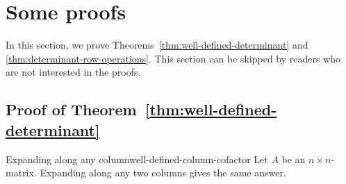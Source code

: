 \section{Some proofs}

In this section, we prove Theorems~\ref{thm:well-defined-determinant}
and {\ref{thm:determinant-row-operations}}. This section can be
skipped by readers who are not interested in the proofs.

\subsection{Proof of Theorem~\ref{thm:well-defined-determinant}}

\begin{lemma}{Expanding along any column}{well-defined-column-cofactor}
  Let $A$ be an $n\times n$-matrix. Expanding along any two columns
  gives the same answer. 
\end{lemma}

